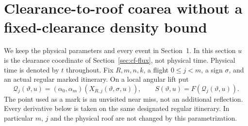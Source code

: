\section{Clearance-to-roof coarea without a fixed-clearance density bound}
\label{sec:cr-coarea}
We keep the physical parameters and every event in Section~1. In this
section $u$ is the clearance coordinate of Section~\ref{sec:cf-flux},
not physical time. Physical time is denoted by $t$ throughout.
Fix $R,m,n,k$, a flight $0\le j<m$, a sign $\sigma$, and an actual
regular marked itinerary. On a local angular lift put
\[
 \mathcal Q_j(\vartheta,u)
   =(\alpha_0,\alpha_m)(X_{R,j}(\vartheta,\sigma,u)),
 \qquad S(\vartheta,u)=F(\mathcal Q_j(\vartheta,u)).
\]
The point used as a mark is an unvisited near miss, not an additional
reflection. Every derivative below is taken on the same designated
regular itinerary. In particular $m$, $j$ and the physical roof are
not changed by this parametrization.

